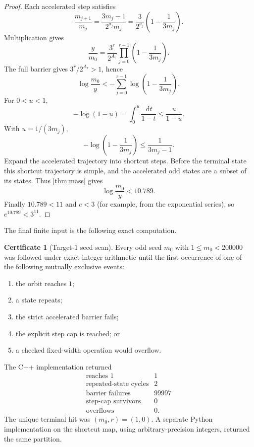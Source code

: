 \documentclass[11pt]{article}
\theoremstyle{definition}
\newtheorem{certificate}[theorem]{Certificate}
\theoremstyle{remark}
\newcommand{\dd}{\,\mathrm d}
\begin{document}
\begin{proof}
Each accelerated step satisfies
\[
 \frac{m_{j+1}}{m_j}
 =\frac{3m_j-1}{2^{a_j}m_j}
 =\frac3{2^{a_j}}\left(1-\frac1{3m_j}\right).
\]
Multiplication gives
\[
 \frac{y}{m_0}
 =\frac{3^r}{2^{A_r}}
 \prod_{j=0}^{r-1}\left(1-\frac1{3m_j}\right).       \tag{7.2}
\]
The full barrier gives $3^r/2^{A_r}>1$, hence
\[
 \log\frac{m_0}{y}
 <-\sum_{j=0}^{r-1}\log\left(1-\frac1{3m_j}\right). \tag{7.3}
\]
For $0<u<1$,
\[
 -\log(1-u)=\int_0^u\frac{\dd t}{1-t}
 \le\frac{u}{1-u}.
\]
With $u=1/(3m_j)$,
\[
 -\log\left(1-\frac1{3m_j}\right)
 \le\frac1{3m_j-1}.                                  \tag{7.4}
\]
Expand the accelerated trajectory into shortcut steps.  Before the terminal
state this shortcut trajectory is simple, and the accelerated odd states are
a subset of its states.  Thus \cref{thm:mass} gives
\[
 \log\frac{m_0}{y}<10.789.
\]
Finally $10.789<11$ and $e<3$ (for example, from the exponential series), so $e^{10.789}<3^{11}$.
\end{proof}

The final finite input is the following exact computation.

\begin{certificate}[Target-$1$ seed scan]\label{cert:seed}
Every odd seed $m_0$ with $1\le m_0<200000$ was followed under exact integer
arithmetic until the first occurrence of one of the following mutually
exclusive events:
\begin{enumerate}[label=\textup{(\roman*)}]
\item the orbit reaches $1$;
\item a state repeats;
\item the strict accelerated barrier fails;
\item the explicit step cap is reached; or
\item a checked fixed-width operation would overflow.
\end{enumerate}
The C++ implementation returned
\[
 \begin{array}{lr}
 \text{reaches }1&1\\
 \text{repeated-state cycles}&2\\
 \text{barrier failures}&99997\\
 \text{step-cap survivors}&0\\
 \text{overflows}&0.
 \end{array}
\]
The unique terminal hit was $(m_0,r)=(1,0)$.  A separate Python
implementation on the shortcut map, using arbitrary-precision integers,
returned the same partition.
\end{certificate}
\end{document}
